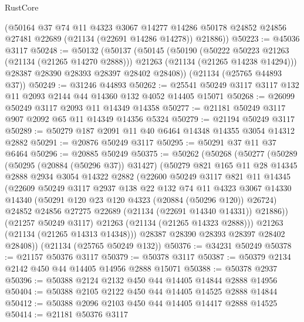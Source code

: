 \begin{lexlean}{RustCore}
\begin{coremodule}
      (@50164
        @37
        @74
        @11
        @4323
        @3067
        @14277
        @14286
        @50178
        @24852
        @24856
        @27481
        @22689
        (@21134 (@22691 @14286 @14278))
        @21886))
@50223 := @45036 @3117
@50248 := @50132
    (@50137
      (@50145
        (@50190
          (@50222 @50223 @21263 (@21134 (@21265 @14270 @2888)))
          @21263
          (@21134 (@21265 @14238 @14294)))
        @28387
        @28390
        @28393
        @28397
        @28402
        @28408))
    (@21134 (@25765 @44893 @37))
@50249 := @31246 @44893
@50262 := @25541 @50249 @3117 @3117 @132 @11 @2093 @2144 @44 @14360 @132 @4052 @14405 @15071
@50268 := @26099 @50249 @3117 @2093 @11 @14349 @14358
@50277 := @21181 @50249 @3117 @907 @2092 @65 @11 @14349 @14356 @5324
@50279 := @21194 @50249 @3117
@50289 := @50279 @187 @2091 @11 @40 @6464 @14348 @14355 @3054 @14312 @2882
@50291 := @20876 @50249 @3117
@50295 := @50291 @37 @11 @37 @6464
@50296 := @20885 @50249
@50375 := @50262
    (@50268
      (@50277
        (@50289
          (@50295 (@20884 (@50296 @37)) @31427)
          (@50279
            @821
            @165
            @11
            @28
            @14345
            @2888
            @2934
            @3054
            @14322
            @2882
            (@22600
              @50249
              @3117
              @821
              @11
              @14345
              (@22609
                @50249
                @3117
                @2937
                @138
                @22
                @132
                @74
                @11
                @4323
                @3067
                @14330
                @14340
                (@50291 @120 @23 @120 @4323 (@20884 (@50296 @120)) @26724)
                @24852
                @24856
                @27275
                @22689
                (@21134 (@22691 @14340 @14331))
                @21886))
            (@21257 @50249 @3117)
            @21263
            (@21134 (@21265 @14323 @2888)))
          @21263
          (@21134 (@21265 @14313 @14348)))
        @28387
        @28390
        @28393
        @28397
        @28402
        @28408))
    (@21134 (@25765 @50249 @132))
@50376 := @34231 @50249
@50378 := @21157 @50376 @3117
@50379 := @50378 @3117
@50387 := @50379 @2134 @2142 @450 @44 @14405 @14956 @2888 @15071
@50388 := @50378 @2937
@50396 := @50388 @2124 @2132 @450 @44 @14405 @14844 @2888 @14956
@50404 := @50388 @2105 @2122 @450 @44 @14405 @14525 @2888 @14844
@50412 := @50388 @2096 @2103 @450 @44 @14405 @14417 @2888 @14525
@50414 := @21181 @50376 @3117

\end{coremodule}
\end{lexlean}
